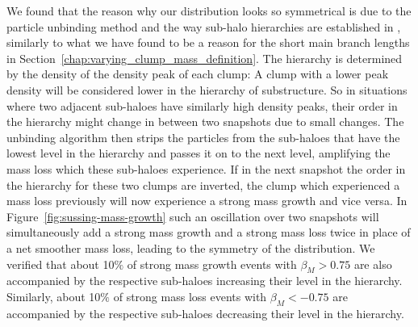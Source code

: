 We found that the reason why our distribution looks so 
symmetrical is due to the particle unbinding method and the way sub-halo hierarchies are 
established in \phew, similarly to what we have found to be a reason for the short main branch
lengths in Section~\ref{chap:varying_clump_mass_definition}. The hierarchy is determined by the 
density of the density peak of each clump: 
A clump with a lower peak density will be considered lower in the hierarchy of substructure. So in 
situations where two adjacent sub-haloes have similarly high density peaks, their order in the 
hierarchy might change in between two snapshots due to small changes. The unbinding algorithm then 
strips the particles from the sub-haloes that have the lowest level in the hierarchy and passes it 
on to the next level, amplifying the mass loss which these sub-haloes experience. If in the next 
snapshot the order in the hierarchy for these two clumps are inverted, the clump which experienced 
a mass loss previously will now experience a strong mass growth and vice versa. In 
Figure~\ref{fig:sussing-mass-growth} such an oscillation over two snapshots will simultaneously add 
a strong mass growth and a strong mass loss twice in place of a net smoother mass loss, leading to 
the symmetry of the distribution. We verified that about 10$\%$ of strong mass growth events with 
$\beta_M > 0.75$ are also accompanied by the respective sub-haloes increasing their level in the 
hierarchy. Similarly, about 10$\%$ of strong mass loss events with $\beta_M < -0.75$ are 
accompanied by the respective sub-haloes decreasing their level in the hierarchy.



